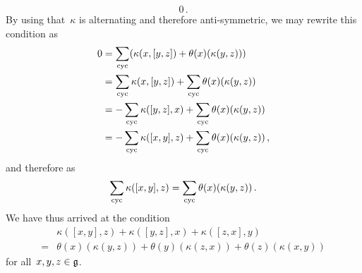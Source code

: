 \begin{fluff}
\begin{enumerate}
\begin{itemize*}
\[						0 \,.
					\]
					By using that~$\kappa$ is alternating and therefore anti-symmetric, we may rewrite this condition as
					\begin{align*}
						0
						&=
						\sum_{\mathrm{cyc}}
						(
							\kappa(x, [y,z])
							+ \theta(x)( \kappa(y,z))
						)
						\\
						&=
						\sum_{\mathrm{cyc}} \kappa(x, [y,z])
						+
						\sum_{\mathrm{cyc}} \theta(x)( \kappa(y,z))
						\\
						&=
						-\sum_{\mathrm{cyc}} \kappa([y,z], x)
						+
						\sum_{\mathrm{cyc}} \theta(x)( \kappa(y,z))
						\\
						&=
						-\sum_{\mathrm{cyc}} \kappa([x,y], z)
						+
						\sum_{\mathrm{cyc}} \theta(x)( \kappa(y,z)) \,,
					\end{align*}
					and therefore as
					\[
						\sum_{\mathrm{cyc}} \kappa([x,y], z)
						=
						\sum_{\mathrm{cyc}} \theta(x)( \kappa(y,z) ) \,.
					\]
					We have thus arrived at the condition
					\begin{equation}
						\label{nonabelian cocycle condition}
						\begin{aligned}
							{}&
							\kappa([x,y], z)
							+ \kappa([y, z], x)
							+ \kappa([z, x], y)
							\\
							={}&
							\theta(x)( \kappa(y,z) )
							+ \theta(y)( \kappa(z,x) )
							+ \theta(z)( \kappa(x,y) )
						\end{aligned}
					\end{equation}
					for all~$x, y, z \in \mathfrak{g}$.


\end{itemize*}
\end{enumerate}
\end{fluff}
